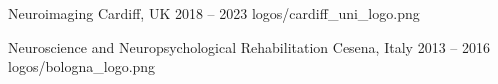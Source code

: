 

\begin{cveducation}
      {Neuroimaging}
      {Cardiff, UK}
      {2018 – 2023}
      {logos/cardiff_uni_logo.png}

      {Neuroscience and Neuropsychological Rehabilitation}
      {Cesena, Italy}
      {2013 – 2016}
      {logos/bologna_logo.png}

\end{cveducation}
    
    

